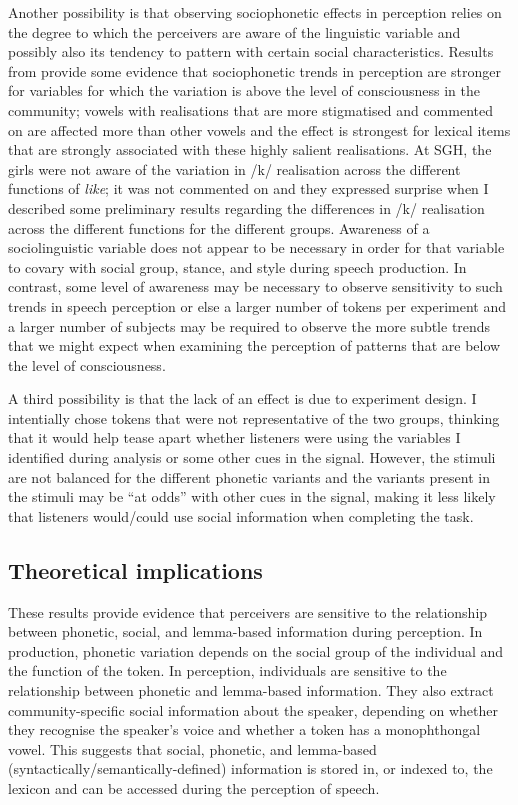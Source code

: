 Another possibility is that observing sociophonetic effects in perception relies on the degree to which the perceivers are aware of the linguistic variable and possibly also its tendency to pattern with certain social characteristics. Results from \citet{haynolandrager2006} provide some evidence that sociophonetic trends in perception are stronger for variables for which the variation is above the level of consciousness in the community; vowels with realisations that are more stigmatised and commented on are affected more than other vowels and the effect is strongest for lexical items that are strongly associated with these highly salient realisations. At SGH, the girls were not aware of the variation in /k/ realisation across the different functions of \textit{like}; it was not commented on and they expressed surprise when I described some preliminary results regarding the differences in /k/ realisation across the different functions for the different groups. Awareness of a sociolinguistic variable does not appear to be necessary in order for that variable to covary with social group, stance, and style during speech production. In contrast, some level of awareness may be necessary to observe sensitivity to such trends in speech perception or else a larger number of tokens per experiment and a larger number of subjects may be required to observe the more subtle trends that we might expect when examining the perception of patterns that are below the level of consciousness.

A third possibility is that the lack of an effect is due to experiment design. I intentially chose tokens that were not representative of the two groups, thinking that it would help tease apart whether listeners were using the variables I identified during analysis or some other cues in the signal. However, the stimuli are not balanced for the different phonetic variants and the variants present in the stimuli may be ``at odds'' with other cues in the signal, making it less likely that listeners would/could use social information when completing the task.


\subsection{Theoretical implications}

These results provide evidence that perceivers are sensitive to the relationship between phonetic, social, and lemma-based information during perception. In production, phonetic variation depends on the social group of the individual and the function of the token. In perception, individuals are sensitive to the relationship between phonetic and lemma-based information. They also extract community-specific social information about the speaker, depending on whether they recognise the speaker's voice and whether a token has a monophthongal vowel. This suggests that social, phonetic, and lemma-based (syntactically/semantically-de\-fined) information is stored in, or indexed to, the lexicon and can be accessed during the perception of speech.

